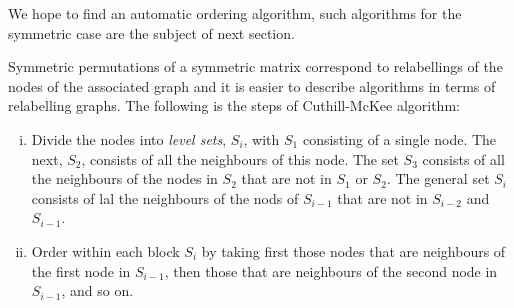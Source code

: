 \begin{rmk}
   We hope to find an automatic ordering algorithm, such algorithms
   for the symmetric case are the subject of next section.
 \end{rmk}
 
\begin{alg}
  Symmetric permutations of a symmetric matrix correspond to
  relabellings of the nodes of the associated graph and it is easier
  to describe algorithms in terms of relabelling graphs.
  The following is the steps of Cuthill-McKee algorithm:
  \begin{enumerate}[(i)]
  \item Divide the nodes into \emph{level sets}, $S_i$, with
  $S_1$ consisting of a single node. The next, $S_2$, consists of all
  the neighbours of this node. The set $S_3$ consists of all the
  neighbours of the nodes in $S_2$ that are not in $S_1$ or $S_2$. The
  general set $S_i$ consists of lal the neighbours of the nods of
  $S_{i-1}$ that are not in $S_{i-2}$ and $S_{i-1}$.
\item Order within each block $S_i$ by taking first those nodes that
  are neighbours of the first node in $S_{i-1}$, then those that are
  neighbours of the second node in $S_{i-1}$, and so on.
  \end{enumerate}
\end{alg}

